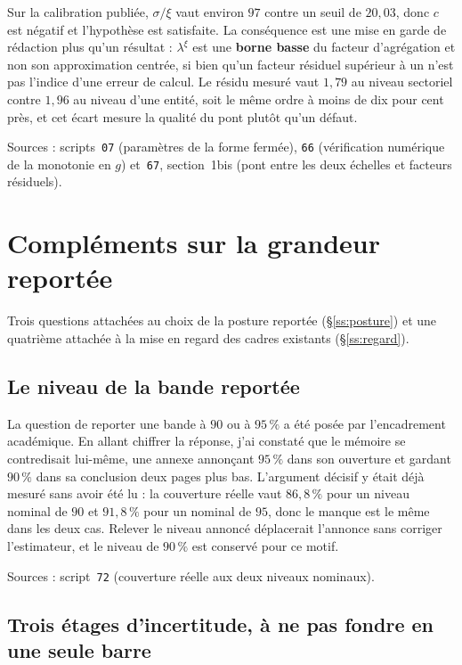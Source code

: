 \documentclass[12pt,a4paper]{article}
\theoremstyle{definition}
\begin{document}
Sur la calibration publiée, $\sigma/\xi$ vaut environ $97$ contre un seuil de
$20{,}03$, donc $c$ est négatif et l'hypothèse est satisfaite. La conséquence est
une mise en garde de rédaction plus qu'un résultat : $\lambda^{\xi}$ est une
\textbf{borne basse} du facteur d'agrégation et non son approximation centrée, si
bien qu'un facteur résiduel supérieur à un n'est pas l'indice d'une erreur de
calcul. Le résidu mesuré vaut $1{,}79$ au niveau sectoriel contre $1{,}96$ au
niveau d'une entité, soit le même ordre à moins de dix pour cent près, et cet écart
mesure la qualité du pont plutôt qu'un défaut.

\vspace{4pt}
\noindent Sources : scripts~\texttt{07} (paramètres de la forme fermée),
\texttt{66} (vérification numérique de la monotonie en $g$) et~\texttt{67},
section~1bis (pont entre les deux échelles et facteurs résiduels).

\section{Compléments sur la grandeur reportée}
\label{ann:posture}

Trois questions attachées au choix de la posture reportée (\S\ref{ss:posture}) et
une quatrième attachée à la mise en regard des cadres existants
(\S\ref{ss:regard}).

\subsection*{Le niveau de la bande reportée}

La question de reporter une bande à $90$ ou à $95\,\%$ a été posée par
l'encadrement académique. En allant chiffrer la réponse, j'ai constaté que le
mémoire se contredisait lui-même, une annexe annonçant $95\,\%$ dans son ouverture
et gardant $90\,\%$ dans sa conclusion deux pages plus bas. L'argument décisif y
était déjà mesuré sans avoir été lu : la couverture réelle vaut $86{,}8\,\%$ pour
un niveau nominal de $90$ et $91{,}8\,\%$ pour un nominal de $95$, donc le manque
est le même dans les deux cas. Relever le niveau annoncé déplacerait l'annonce sans
corriger l'estimateur, et le niveau de $90\,\%$ est conservé pour ce motif.

\vspace{4pt}
\noindent Sources : script~\texttt{72} (couverture réelle aux deux niveaux
nominaux).

\subsection*{Trois étages d'incertitude, à ne pas fondre en une seule barre}
\end{document}
